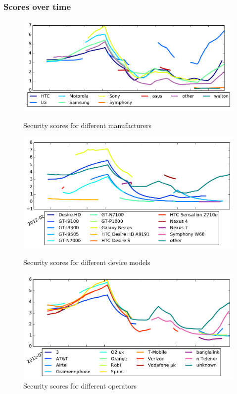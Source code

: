 \subsubsection{Scores over time}
\begin{figure}
\centering
\includegraphics[width=\columnwidth]{figures/security_score_manufacturer}
\caption{Security scores for different manufacturers}
\label{fig:security_score_manufacturer}
\includegraphics[width=\columnwidth]{figures/security_score_model}
\caption{Security scores for different device models}
\label{fig:security_score_model}
\includegraphics[width=\columnwidth]{figures/security_score_operator}
\caption{Security scores for different operators}
\label{fig:security_score_operator}
\end{figure}
